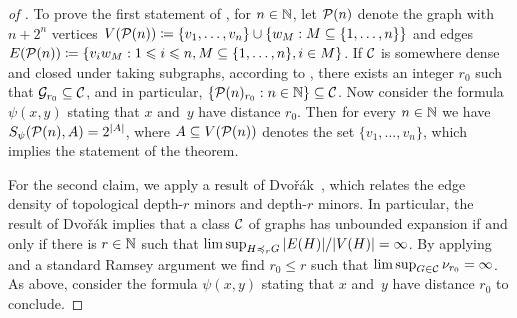 \begin{proof}[of ]
To prove the first statement of , 
for $n\in \mathbb{N}$, let $\mathcal{P}(n)$ denote the graph with $n+2^n$ 
vertices $V(\mathcal{P}(n))\coloneqq \{v_1,\ldots, v_n\}\cup \{w_M : M\subseteq \{1,\ldots, n\}\}$ and edges $E(\mathcal{P}(n))\coloneqq \{v_iw_M :1\leqslant i\leqslant n, M\subseteq \{1,\ldots, n\}, i\in M\}$. 
If $\mathcal{C}$ is somewhere dense and closed under taking subgraphs, 
according to , there exists an integer $r_0$ 
such that $\mathcal{G}_{r_0}\subseteq \mathcal{C}$, and in particular, 
$\{\mathcal{P}(n)_{r_0} :n\in \mathbb{N}\}\subseteq \mathcal{C}$. Now consider 
the formula $\psi(x,y)$ stating that $x$ and~$y$ have 
distance $r_0$. Then for every $n\in \mathbb{N}$ we have 
$S_\psi(\mathcal{P}(n),A)=2^{|A|}$, where $A\subseteq V(\mathcal{P}(n))$ denotes the set $\{v_1,\ldots, v_n\}$, which implies the statement
of the theorem.

For the second claim, we apply a result of Dvo\v{r}\'ak~\cite{s}, 
which relates the edge density of topological depth-$r$ minors
and depth-$r$ minors. In particular, the result of Dvo\v{r}\'ak
implies that a 
class $\mathcal{C}$ of graphs has unbounded expansion if and only 
if there is $r\in \mathbb{N}$ such that $\limsup_{H\preccurlyeq_r G}|E(H)|/|V(H)|=\infty$. By applying  and 
a standard Ramsey argument we find $r_0\leq r$ such that 
$\limsup_{G\in\mathcal{C}}\nu_{r_0}=\infty$. As above, consider 
the formula $\psi(x,y)$ stating that $x$ and~$y$ have 
distance $r_0$ to conclude. 
\end{proof}

